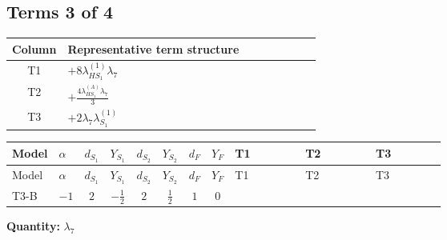 \documentclass[8pt]{article}
\begin{document}
\begin{landscape}
\subsection*{Terms 3 of 4}
\begin{center}
\begin{tabular}{@{}c >{\raggedright\arraybackslash}p{0.82\linewidth}@{}}
\toprule
Column & Representative term structure \\
\midrule
T1 & \(\displaystyle +8 {\lambda_{HS_1}^{(1)}} {\lambda_{7}}\) \\
\midrule
T2 & \(\displaystyle +\frac{4 {\lambda_{HS_1}^{(A)}} {\lambda_{7}}}{3}\) \\
\midrule
T3 & \(\displaystyle +2 {\lambda_{7}} {\lambda_{S_1}^{(1)}}\) \\
\midrule
\bottomrule
\end{tabular}
\end{center}
\smallskip
\tiny
\begin{longtable}{@{}llcccccc >{\raggedright\arraybackslash}p{0.21\linewidth} >{\raggedright\arraybackslash}p{0.21\linewidth} >{\raggedright\arraybackslash}p{0.21\linewidth}@{}}
\toprule
Model & $\alpha$ & $d_{S_1}$ & $Y_{S_1}$ & $d_{S_2}$ & $Y_{S_2}$ & $d_F$ & $Y_F$ & T1 & T2 & T3 \\
\midrule
\endfirsthead
\toprule
Model & $\alpha$ & $d_{S_1}$ & $Y_{S_1}$ & $d_{S_2}$ & $Y_{S_2}$ & $d_F$ & $Y_F$ & T1 & T2 & T3 \\
\midrule
\endhead
T3-B & $-1$ & $2$ & $-\frac{1}{2}$ & $2$ & $\frac{1}{2}$ & $1$ & $0$ & \scriptsize\adjustbox{max width=\linewidth}{$\begin{gathered} +8 {\lambda_{HS_1}^{(1)}} {\lambda_{7}}\end{gathered}$} & \scriptsize\adjustbox{max width=\linewidth}{$\begin{gathered} +\frac{4 {\lambda_{HS_1}^{(A)}} {\lambda_{7}}}{3}\end{gathered}$} & \scriptsize\adjustbox{max width=\linewidth}{$\begin{gathered} +2 {\lambda_{7}} {\lambda_{S_1}^{(1)}}\end{gathered}$} \\
\midrule
\bottomrule
\end{longtable}
\clearpage
\noindent\textbf{Quantity: }$\lambda_{7}$\par\smallskip

\end{landscape}
\end{document}
